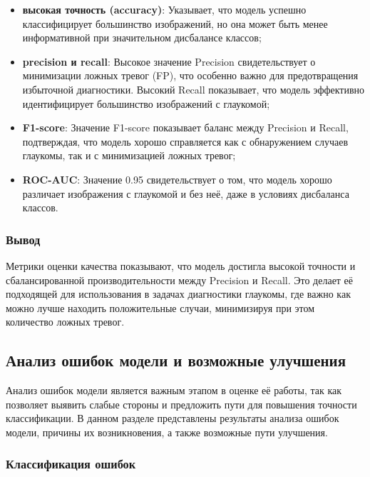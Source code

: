 {    \begin{itemize}
        \item \textbf{высокая точность (accuracy)}: Указывает, что модель успешно классифицирует большинство изображений, но она может быть менее информативной при значительном дисбалансе классов;
        \item \textbf{precision и recall}: Высокое значение Precision свидетельствует о минимизации ложных тревог (FP), что особенно важно для предотвращения избыточной диагностики. Высокий Recall показывает, что модель эффективно идентифицирует большинство изображений с глаукомой;
        \item \textbf{F1-score}: Значение F1-score показывает баланс между Precision и Recall, подтверждая, что модель хорошо справляется как с обнаружением случаев глаукомы, так и с минимизацией ложных тревог;
        \item \textbf{ROC-AUC}: Значение 0.95 свидетельствует о том, что модель хорошо различает изображения с глаукомой и без неё, даже в условиях дисбаланса классов.
    \end{itemize}

    \subsubsection*{Вывод}

    Метрики оценки качества показывают, что модель достигла высокой точности и сбалансированной производительности между Precision и Recall. Это делает её подходящей для использования в задачах диагностики глаукомы, где важно как можно лучше находить положительные случаи, минимизируя при этом количество ложных тревог.


    \subsection{Анализ ошибок модели и возможные улучшения}

    Анализ ошибок модели является важным этапом в оценке её работы, так как позволяет выявить слабые стороны и предложить пути для повышения точности классификации. В данном разделе представлены результаты анализа ошибок модели, причины их возникновения, а также возможные пути улучшения.

    \subsubsection*{Классификация ошибок}

}
